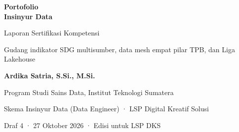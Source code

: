 \begin{titlepage}
\thispagestyle{empty}
\vspace*{3cm}
{\color{biru}\Huge\bfseries Portofolio\\Insinyur Data\par}
\vspace{0.6cm}
{\Large Laporan Sertifikasi Kompetensi\par}
\vspace{0.4cm}
{\large Gudang indikator SDG multisumber, data mesh empat pilar TPB, dan Liga Lakehouse\par}
\vfill
{\large\bfseries Ardika Satria, S.Si., M.Si.\par}
{\normalsize Program Studi Sains Data, Institut Teknologi Sumatera\par}
\vspace{0.5cm}
{\normalsize Skema Insinyur Data (Data Engineer) · LSP Digital Kreatif Solusi\par}
\vspace{0.3cm}
{\normalsize\color{abu}Draf 4 · 27 Oktober 2026 · Edisi untuk LSP DKS\par}
\vspace{1.5cm}
\end{titlepage}
\tableofcontents
\clearpage
